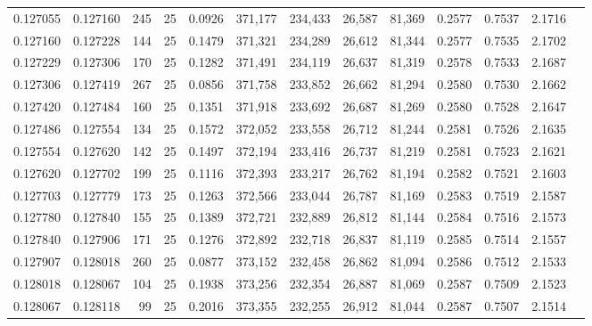 \begin{tabular}{rrrrrrrrrrrrr}
0.127055 & 0.127160 &   245 &  25 &                                     0.0926 & 371,177 & 234,433 &  26,587 &  81,369 & 0.2577 & 0.7537 & 2.1716 \\
0.127160 & 0.127228 &   144 &  25 &                                     0.1479 & 371,321 & 234,289 &  26,612 &  81,344 & 0.2577 & 0.7535 & 2.1702 \\
0.127229 & 0.127306 &   170 &  25 &                                     0.1282 & 371,491 & 234,119 &  26,637 &  81,319 & 0.2578 & 0.7533 & 2.1687 \\
0.127306 & 0.127419 &   267 &  25 &                                     0.0856 & 371,758 & 233,852 &  26,662 &  81,294 & 0.2580 & 0.7530 & 2.1662 \\
0.127420 & 0.127484 &   160 &  25 &                                     0.1351 & 371,918 & 233,692 &  26,687 &  81,269 & 0.2580 & 0.7528 & 2.1647 \\
0.127486 & 0.127554 &   134 &  25 &                                     0.1572 & 372,052 & 233,558 &  26,712 &  81,244 & 0.2581 & 0.7526 & 2.1635 \\
0.127554 & 0.127620 &   142 &  25 &                                     0.1497 & 372,194 & 233,416 &  26,737 &  81,219 & 0.2581 & 0.7523 & 2.1621 \\
0.127620 & 0.127702 &   199 &  25 &                                     0.1116 & 372,393 & 233,217 &  26,762 &  81,194 & 0.2582 & 0.7521 & 2.1603 \\
0.127703 & 0.127779 &   173 &  25 &                                     0.1263 & 372,566 & 233,044 &  26,787 &  81,169 & 0.2583 & 0.7519 & 2.1587 \\
0.127780 & 0.127840 &   155 &  25 &                                     0.1389 & 372,721 & 232,889 &  26,812 &  81,144 & 0.2584 & 0.7516 & 2.1573 \\
0.127840 & 0.127906 &   171 &  25 &                                     0.1276 & 372,892 & 232,718 &  26,837 &  81,119 & 0.2585 & 0.7514 & 2.1557 \\
0.127907 & 0.128018 &   260 &  25 &                                     0.0877 & 373,152 & 232,458 &  26,862 &  81,094 & 0.2586 & 0.7512 & 2.1533 \\
0.128018 & 0.128067 &   104 &  25 &                                     0.1938 & 373,256 & 232,354 &  26,887 &  81,069 & 0.2587 & 0.7509 & 2.1523 \\
0.128067 & 0.128118 &    99 &  25 &                                     0.2016 & 373,355 & 232,255 &  26,912 &  81,044 & 0.2587 & 0.7507 & 2.1514 \\

\end{tabular}
